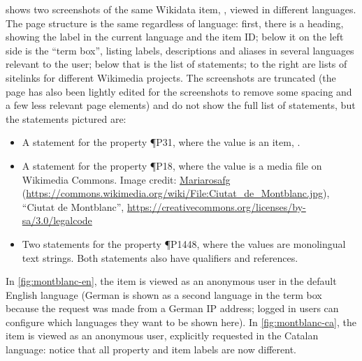  shows two screenshots of the same Wikidata item,
, viewed in different languages.
The page structure is the same regardless of language:
first, there is a heading, showing the label in the current language and the item ID;
below it on the left side is the “term box”,
listing labels, descriptions and aliases in several languages relevant to the user;
below that is the list of statements;
to the right are lists of sitelinks for different Wikimedia projects.
The screenshots are truncated
(the page has also been lightly edited for the screenshots
to remove some spacing and a few less relevant page elements)
and do not show the full list of statements,
but the statements pictured are:
\begin{itemize}
\item A statement for the property \P{P31},
  where the value is an item, .
\item A statement for the property \P{P18},
  where the value is a media file on Wikimedia Commons.
  Image credit:
  \href{https://commons.wikimedia.org/wiki/User:Mariarosafg}{Mariarosafg}
  (\url{https://commons.wikimedia.org/wiki/File:Ciutat_de_Montblanc.jpg}),
  “Ciutat de Montblanc”,
  \url{https://creativecommons.org/licenses/by-sa/3.0/legalcode}
\item Two statements for the property \P{P1448},
  where the values are monolingual text strings.
  Both statements also have qualifiers and references.
\end{itemize}
In \cref{fig:montblanc-en},
the item is viewed as an anonymous user in the default English language
(German is shown as a second language in the term box
because the request was made from a German IP address;
logged in users can configure which languages they want to be shown here).
In \cref{fig:montblanc-ca},
the item is viewed as an anonymous user, explicitly requested in the Catalan language:
notice that all property and item labels are now different.


